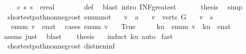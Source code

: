 \begin{isabellebody}
\ \ \isamarkupfalse%
\ {\isachardoublequoteopen}{\isasymmu}\ c\ s\ s\ {\isasymge}\ ereal\ {}{\isachardoublequoteclose}\ \isanewline
\ \ \ \ \isamarkupfalse%
\ {\isasymmu}{\isacharunderscore}def\ \isamarkupfalse%
\ {\isacharparenleft}blast\ intro{\isacharcolon}\ INF{\isacharunderscore}greatest{\isacharparenright}\isanewline
\ \ \isamarkupfalse%
\isanewline
\ \ \isamarkupfalse%
\ {\isacharquery}thesis\ \isamarkupfalse%
\ simp\isanewline
{}\isamarkupfalse%
%
\endisatagproof
{\isafoldproof}%
%
\isadelimproof
\isanewline
%
\endisadelimproof
\isanewline
{}\isamarkupfalse%
\ {\isacharparenleft}\ shortest{\isacharunderscore}path{\isacharunderscore}non{\isacharunderscore}neg{\isacharunderscore}cost{\isacharparenright}\ enum{\isacharunderscore}not{}{\isacharcolon}\isanewline
\ \ \ v\ {\isacharcolon}{\isacharcolon}\ {\isacharprime}a\isanewline
\ \ \ {\isachardoublequoteopen}v\ {\isasymin}\ verts\ G{\isachardoublequoteclose}\isanewline
\ \ \ {\isachardoublequoteopen}v\ {\isasymnoteq}\ s{\isachardoublequoteclose}\isanewline
\ \ \isanewline
\ \ \ {\isachardoublequoteopen}enum\ v\ {\isasymnoteq}\ enat\ {}{\isachardoublequoteclose}\isanewline
%
\isadelimproof
%
\endisadelimproof
%
\isatagproof
{}\isamarkupfalse%
\ {\isacharparenleft}cases\ {\isachardoublequoteopen}enum\ v\ {\isasymnoteq}\ {\isasyminfinity}{\isachardoublequoteclose}{\isacharparenright}\isanewline
{}\isamarkupfalse%
\ True\isanewline
\ \ \isamarkupfalse%
\ \isamarkupfalse%
\ ku\ \ {\isachardoublequoteopen}enum\ v\ {\isacharequal}\ ku\ {\isacharplus}\ enat\ {}{\isachardoublequoteclose}\ \isanewline
\ \ \ \ \isamarkupfalse%
\ assms\ just\ \isamarkupfalse%
\ blast\isanewline
\ \ \isamarkupfalse%
\ {\isacharquery}thesis\ \ \isamarkupfalse%
\ {\isacharparenleft}induct\ ku{\isacharparenright}\ auto\isanewline
{}\isamarkupfalse%
\ fast%
\endisatagproof
{\isafoldproof}%
%
\isadelimproof
\isanewline
%
\endisadelimproof
\isanewline
{}\isamarkupfalse%
\ {\isacharparenleft}\ shortest{\isacharunderscore}path{\isacharunderscore}non{\isacharunderscore}neg{\isacharunderscore}cost{\isacharparenright}\ dist{\isacharunderscore}ne{\isacharunderscore}ninf{\isacharcolon}\isanewline

\end{isabellebody}
